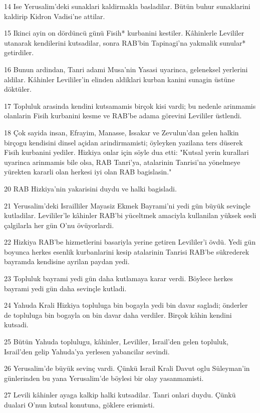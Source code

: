 \par 14 Ise Yerusalim'deki sunaklari kaldirmakla basladilar. Bütün buhur sunaklarini kaldirip Kidron Vadisi'ne attilar.
\par 15 Ikinci ayin on dördüncü günü Fisih* kurbanini kestiler. Kâhinlerle Levililer utanarak kendilerini kutsadilar, sonra RAB'bin Tapinagi'na yakmalik sunular* getirdiler.
\par 16 Bunun ardindan, Tanri adami Musa'nin Yasasi uyarinca, geleneksel yerlerini aldilar. Kâhinler Levililer'in elinden aldiklari kurban kanini sunagin üstüne döktüler.
\par 17 Topluluk arasinda kendini kutsamamis birçok kisi vardi; bu nedenle arinmamis olanlarin Fisih kurbanini kesme ve RAB'be adama görevini Levililer üstlendi.
\par 18 Çok sayida insan, Efrayim, Manasse, Issakar ve Zevulun'dan gelen halkin birçogu kendisini dinsel açidan arindirmamisti; öyleyken yazilana ters düserek Fisih kurbanini yediler. Hizkiya onlar için söyle dua etti: "Kutsal yerin kurallari uyarinca arinmamis bile olsa, RAB Tanri'ya, atalarinin Tanrisi'na yönelmeye yürekten kararli olan herkesi iyi olan RAB bagislasin."
\par 20 RAB Hizkiya'nin yakarisini duydu ve halki bagisladi.
\par 21 Yerusalim'deki Israilliler Mayasiz Ekmek Bayrami'ni yedi gün büyük sevinçle kutladilar. Levililer'le kâhinler RAB'bi yüceltmek amaciyla kullanilan yüksek sesli çalgilarla her gün O'nu övüyorlardi.
\par 22 Hizkiya RAB'be hizmetlerini basariyla yerine getiren Levililer'i övdü. Yedi gün boyunca herkes esenlik kurbanlarini kesip atalarinin Tanrisi RAB'be sükrederek bayramda kendisine ayrilan paydan yedi.
\par 23 Topluluk bayrami yedi gün daha kutlamaya karar verdi. Böylece herkes bayrami yedi gün daha sevinçle kutladi.
\par 24 Yahuda Krali Hizkiya topluluga bin bogayla yedi bin davar sagladi; önderler de topluluga bin bogayla on bin davar daha verdiler. Birçok kâhin kendini kutsadi.
\par 25 Bütün Yahuda toplulugu, kâhinler, Levililer, Israil'den gelen topluluk, Israil'den gelip Yahuda'ya yerlesen yabancilar sevindi.
\par 26 Yerusalim'de büyük sevinç vardi. Çünkü Israil Krali Davut oglu Süleyman'in günlerinden bu yana Yerusalim'de böylesi bir olay yasanmamisti.
\par 27 Levili kâhinler ayaga kalkip halki kutsadilar. Tanri onlari duydu. Çünkü dualari O'nun kutsal konutuna, göklere erismisti.

